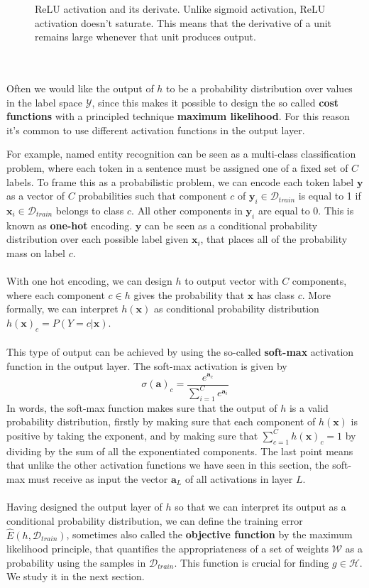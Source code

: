 \begin{figure}
	\centering
	
	\caption{ReLU activation and its derivate. Unlike sigmoid activation, ReLU activation doesn't saturate. This means that the derivative of a unit remains large whenever that unit produces output.}
	\label{relu}
\end{figure}
\\\\
Often we would like the output of $h$ to be a probability distribution over values in the label space $\mathcal{Y}$, since this makes it possible to design the so called \textbf{cost functions} with a principled technique \textbf{maximum likelihood}. For this reason it's common to use different activation functions in the output layer. 

For example, named entity recognition can be seen as a multi-class classification problem, where each token in a sentence must be assigned one of a fixed set of $C$ labels. To frame this as a probabilistic problem, we can encode each token label $\mathbf{y}$ as a vector of $C$ probabilities such that component $c$ of $\mathbf{y}_i \in \mathcal{D}_{train}$ is equal to 1 if $\mathbf{x}_i \in \mathcal{D}_{train}$ belongs to class $c$. All other components in $\mathbf{y}_i$ are equal to 0. This is known as \textbf{one-hot} encoding. $\mathbf{y}$ can be seen as a conditional probability distribution over each possible label given $\mathbf{x}_i$, that places all of the probability mass on label $c$.
\\\\
With one hot encoding, we can design $h$ to output vector with $C$ components, where each component $c \in h$ gives the probability that $\mathbf{x}$ has class $c$. More formally, we can interpret $h(\mathbf{x})$ as conditional probability distribution $h(\mathbf{x})_c = P(Y = c | \mathbf{x})$.
\\\\
This type of output can be achieved by using the so-called \textbf{soft-max} activation function in the output layer. The soft-max activation is given by 
$$
\sigma(\mathbf{a})_c = \frac{e^{\mathbf{a}_c}}{\sum_{i = 1}^C e^{\mathbf{a}_i}}
$$ 
In words, the soft-max function makes sure that the output of $h$ is a valid probability distribution, firstly by making sure that each component of $h(\mathbf{x})$ is positive by taking the exponent, and by making sure that $\sum_{c=1}^Ch(\mathbf{x})_c = 1$ by dividing by the sum of all the exponentiated components. The last point means that unlike the other activation functions we have seen in this section, the soft-max must receive as input the vector $\mathbf{a}_L$ of all activations in layer $L$.
\\\\
Having designed the output layer of $h$ so that we can interpret its output as a conditional probability distribution, we can define the training error $\hat{E}(h, \mathcal{D}_{train})$, sometimes also called the \textbf{objective function} by the maximum likelihood principle, that quantifies the appropriateness of a set of weights $\mathcal{W}$ as a probability using the samples in $\mathcal{D}_{train}$. This function is crucial for finding $g \in \mathcal{H}$. We study it in the next section.

